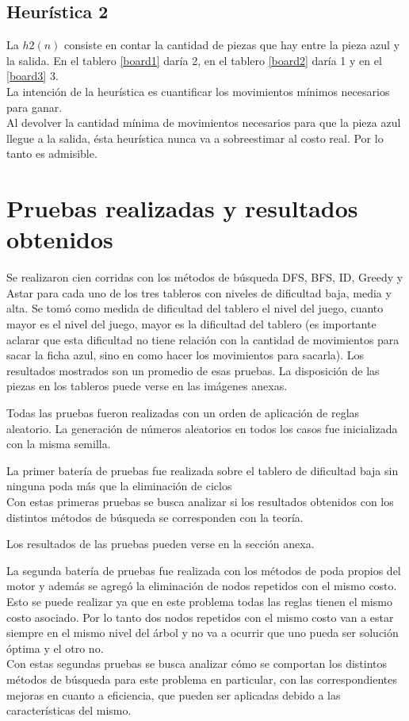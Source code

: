 \documentclass[10pt,journal,compsoc]{IEEEtran}
\begin{document}
\subsection{Heur\'istica 2}
La $h2(n)$ consiste en contar la cantidad de piezas que hay entre la pieza azul y la salida. En el tablero \ref{board1} dar\'ia 2, en el tablero \ref{board2} dar\'ia 1 y en el \ref{board3} 3.\\
La intenci\'on de la heur\'istica es cuantificar los movimientos m\'inimos necesarios para ganar.\\
Al devolver la cantidad m\'inima de movimientos necesarios para que la pieza azul llegue a la salida, \'esta heur\'istica nunca va a sobreestimar al costo real. Por lo tanto es admisible.

\section{Pruebas realizadas y resultados obtenidos}

Se realizaron cien corridas con los m\'etodos de b\'usqueda DFS, BFS, ID, Greedy y Astar para cada uno de los tres tableros con niveles de dificultad baja, media y alta. Se tom\'o como medida de dificultad del tablero el nivel del juego, cuanto mayor es el nivel del juego, mayor es la dificultad del tablero (es importante aclarar que esta dificultad no tiene relaci\'on con la cantidad de movimientos para sacar la ficha azul, sino en como hacer los movimientos para sacarla). Los resultados mostrados son un promedio de esas pruebas. La disposici\'on de las piezas en los tableros puede verse en las im\'agenes anexas.

Todas las pruebas fueron realizadas con un orden de aplicaci\'on de reglas aleatorio. La generaci\'on de n\'umeros aleatorios en todos los casos fue inicializada con la misma semilla.

La primer bater\'ia de pruebas fue realizada sobre el tablero de dificultad baja sin ninguna poda m\'as que la eliminaci\'on de ciclos\\ Con estas primeras pruebas se busca analizar si los resultados obtenidos con los distintos m\'etodos de b\'usqueda se corresponden con la teor\'ia.

Los resultados de las pruebas pueden verse en la secci\'on anexa.

La segunda bater\'ia de pruebas fue realizada con los m\'etodos de poda propios del motor y adem\'as se agreg\'o la eliminaci\'on de nodos repetidos con el mismo costo. Esto se puede realizar ya que en este problema todas las reglas tienen el mismo costo asociado. Por lo tanto dos nodos repetidos con el mismo costo van a estar siempre en el mismo nivel del \'arbol y no va a ocurrir que uno pueda ser soluci\'on \'optima y el otro no.\\
Con estas segundas pruebas se busca analizar c\'omo se comportan los distintos m\'etodos de b\'usqueda para este problema en particular, con las correspondientes mejoras en cuanto a eficiencia, que pueden ser aplicadas debido a las caracter\'isticas del mismo.
\end{document}
